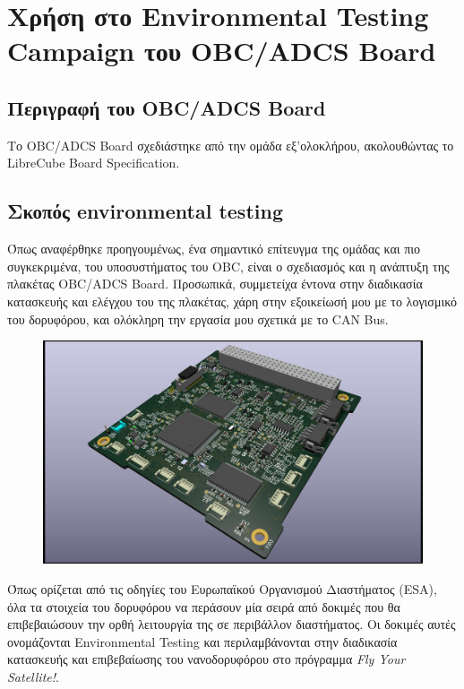 \documentclass[a4paper,nobib,justified]{tufte-book}
\begin{document}
\section{Χρήση στο Environmental Testing Campaign του OBC/ADCS Board}
	\subsection{Περιγραφή του OBC/ADCS Board}
	Το OBC/ADCS Board σχεδιάστηκε από την ομάδα εξ'ολοκλήρου, ακολουθώντας το LibreCube Board Specification. %

	\subsection{Σκοπός environmental testing}
	Όπως αναφέρθηκε προηγουμένως, ένα σημαντικό επίτευγμα της ομάδας και πιο συγκεκριμένα, του υποσυστήματος του OBC, είναι ο σχεδιασμός και η ανάπτυξη της πλακέτας OBC/ADCS Board. Προσωπικά, συμμετείχα έντονα στην διαδικασία κατασκευής και ελέγχου του της πλακέτας, χάρη στην εξοικείωσή μου με το λογισμικό του δορυφόρου, και ολόκληρη την εργασία μου σχετικά με το CAN Bus.

	\begin{figure}[ht]
		\includegraphics{media/images/obc-adcs-board.jpg}
	\end{figure}

	\par Όπως ορίζεται από τις οδηγίες του Ευρωπαϊκού Οργανισμού Διαστήματος (ESA), όλα τα στοιχεία του δορυφόρου να περάσουν μία σειρά από δοκιμές που θα επιβεβαιώσουν την ορθή λειτουργία της σε περιβάλλον διαστήματος. Οι δοκιμές αυτές ονομάζονται Environmental Testing και περιλαμβάνονται στην διαδικασία κατασκευής και επιβεβαίωσης του νανοδορυφόρου στο πρόγραμμα \textit{Fly Your Satellite!}.
\end{document}
